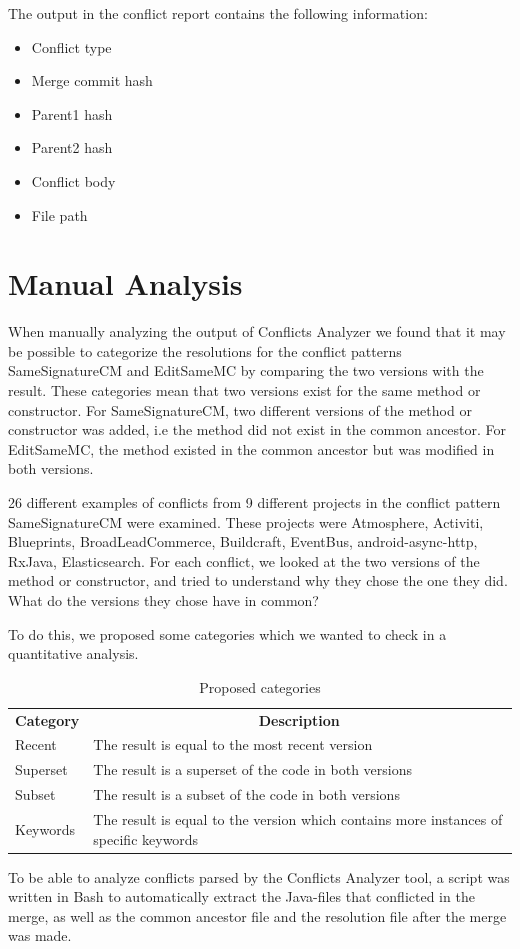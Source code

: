 The output in the conflict report contains the following information:
\begin{itemize}
\item Conflict type
\item Merge commit hash
\item Parent1 hash
\item Parent2 hash
\item Conflict body
\item File path
\end{itemize}

\section{Manual Analysis}
When manually analyzing the output of Conflicts Analyzer we found that it may be possible to categorize the resolutions for the conflict patterns SameSignatureCM and EditSameMC by comparing the two versions with the result. These categories mean that two versions exist for the same method or constructor. For SameSignatureCM, two different versions of the method or constructor was added, i.e the method did not exist in the common ancestor. For EditSameMC, the method existed in the common ancestor but was modified in both versions.

26 different examples of conflicts from 9 different projects in the conflict pattern SameSignatureCM were examined. These projects were Atmosphere, Activiti, Blueprints, BroadLeadCommerce, Buildcraft, EventBus, android-async-http, RxJava, Elasticsearch. For each conflict, we looked at the two versions of the method or constructor, and tried to understand why they chose the one they did. What do the versions they chose have in common?

To do this, we proposed some categories which we wanted to check in a quantitative analysis.
\begin{table}
\caption{Proposed categories}\label{table:pcategories}
\begin{tabular}{ p{8cm} p{6cm} }
\hline
\multicolumn{1}{c}{\textbf{Category}} & \multicolumn{1}{c}{\textbf{Description}}\\
Recent & The result is equal to the most recent version\\
Superset & The result is a superset of the code in both versions\\
Subset & The result is a subset of the code in both versions\\
Keywords & The result is equal to the version which contains more instances of specific keywords\\
\end{tabular}
\end{table}
To be able to analyze conflicts parsed by the Conflicts Analyzer tool, a script was written in Bash to automatically extract the Java-files that conflicted in the merge, as well as the common ancestor file and the resolution file after the merge was made.


